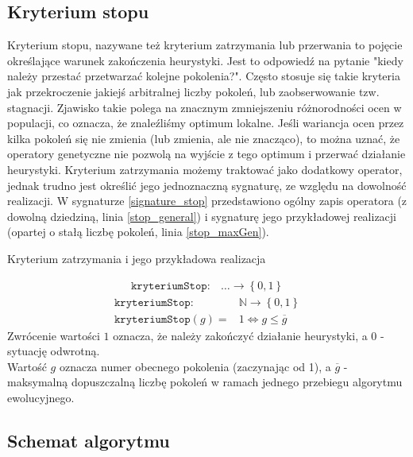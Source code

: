 \documentclass[twoside]{iisthesis}
\newcommand{\numberSet}{\mathbb}
\newcommand{\param}{\mathtt}
\begin{document}
\subsection{Kryterium stopu}

Kryterium stopu, nazywane też kryterium zatrzymania lub przerwania to pojęcie określające warunek zakończenia heurystyki. Jest to odpowiedź na pytanie "kiedy należy przestać przetwarzać kolejne pokolenia?". Często stosuje się takie kryteria jak przekroczenie jakiejś arbitralnej liczby pokoleń, lub zaobserwowanie tzw. stagnacji. Zjawisko takie polega na znacznym zmniejszeniu różnorodności ocen w populacji, co oznacza, że znaleźliśmy optimum lokalne. Jeśli wariancja ocen przez kilka pokoleń się nie zmienia (lub zmienia, ale nie znacząco), to można uznać, że operatory genetyczne nie pozwolą na wyjście z tego optimum i przerwać działanie heurystyki. 
Kryterium zatrzymania możemy traktować jako dodatkowy operator, jednak trudno jest określić jego jednoznaczną sygnaturę, ze względu na dowolność realizacji. W sygnaturze \ref{signature_stop} przedstawiono ogólny zapis operatora (z dowolną dziedziną, linia \ref{stop_general}) i sygnaturę jego przykładowej realizacji (opartej o stałą liczbę pokoleń, linia \ref{stop_maxGen}).

\begin{signature}
	\caption{Kryterium zatrzymania i jego przykładowa realizacja \label{signature_stop}} 
	\begin{align}
		\label{stop_general}
		\param{kryteriumStop}: &\ldots \rightarrow \left\{ 0, 1 \right\}
	\end{align}
	\begin{align}
		\label{stop_maxGen}
		\param{kryteriumStop}: &\numberSet{N} \rightarrow \left\{ 0, 1 \right\} \\
		\param{kryteriumStop}(g) = &1 \Leftrightarrow g \leq \overline{g}
	\end{align}
	Zwrócenie wartości $1$ oznacza, że należy zakończyć działanie heurystyki, a $0$ - sytuację odwrotną. \\ 
	Wartość $g$ oznacza numer obecnego pokolenia (zaczynając od 1), a $\overline{g}$ - maksymalną dopuszczalną liczbę pokoleń w ramach jednego przebiegu algorytmu ewolucyjnego.
\end{signature}	

\subsection{Schemat algorytmu}
\end{document}
